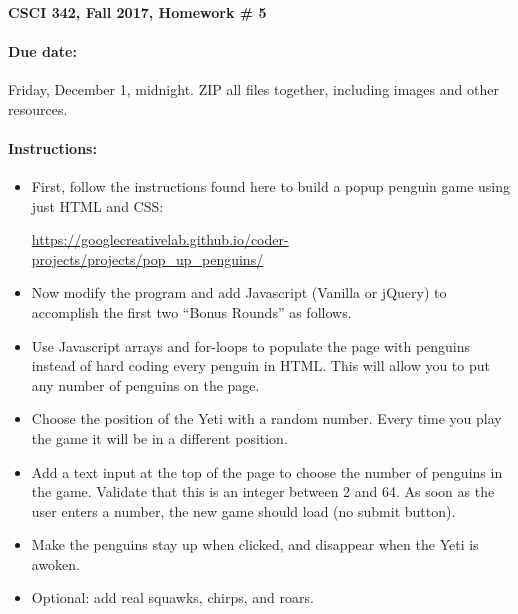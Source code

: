 \documentclass{article}
\newcommand{\myitem}{\paragraph}
\begin{document}
\myitem{CSCI 342, Fall 2017, Homework \# 5}

\myitem{Due date:}  Friday, December 1, midnight.  ZIP all files
together, including images and other resources.

\myitem{Instructions:}

\begin{itemize}
\item
First, follow the instructions found here to build a popup penguin game
using just HTML and CSS:

\centerline{\url{https://googlecreativelab.github.io/coder-projects/projects/pop_up_penguins/}}

\item Now modify the program and add Javascript (Vanilla or jQuery)
  to accomplish the first two ``Bonus Rounds'' as follows.

\item Use Javascript arrays and for-loops to populate the page with
  penguins instead of hard coding every penguin in HTML.  This will
  allow you to put any number of penguins on the page.

\item Choose the position of the Yeti with a random number.  Every
  time you play the game it will be in a different position.
  
\item Add a text input at the top of the page to choose the number of
  penguins in the game.  Validate that this is an integer between 2
  and 64.  As soon as the user enters a number, the new game should
  load (no submit button).

\item Make the penguins stay up when clicked, and disappear when the
  Yeti is awoken.

\item Optional:  add real squawks, chirps, and roars.  

\end{itemize}
\end{document}
